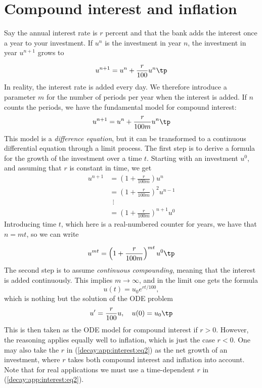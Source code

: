\documentclass[graybox,sectrefs,envcountresetchap,open=right,final]{svmonodo}
\begin{document}
\section{Compound interest and inflation}
\label{decay:app:interest}

Say the annual interest rate is $r$ percent and that the bank
adds the interest once a year to your investment.
If $u^n$ is the investment in year $n$, the investment in year $u^{n+1}$
grows to

\[ u^{n+1} = u^n + \frac{r}{100}u^n
\tp  \]
In reality, the interest rate is added every day. We therefore introduce
a parameter $m$ for the number of periods per year when the interest
is added. If $n$ counts the periods, we have the fundamental model
for compound interest:
\begin{equation}
u^{n+1} = u^n + \frac{r}{100 m}u^n
\tp
\label{decay:app:interest:eq1}
\end{equation}
This model is a \emph{difference equation}, but it can be transformed to a
continuous differential equation through a limit process.
The first step is to derive a formula for the growth of the investment
over a time $t$.
Starting with an investment $u^0$, and assuming that $r$ is constant in time,
we get
\begin{align*}
u^{n+1} &= \left(1 + \frac{r}{100 m}\right)u^{n}\\ 
&= \left(1 + \frac{r}{100 m}\right)^2u^{n-1}\\ 
&\ \ \vdots\\ 
&= \left(1 +\frac{r}{100 m}\right)^{n+1}u^{0}
\end{align*}
Introducing time $t$, which here is a real-numbered counter for years,
we have that $n=mt$, so we can write

\[ u^{mt} = \left(1 + \frac{r}{100 m}\right)^{mt} u^0\tp  \]
The second step is to assume \emph{continuous compounding}, meaning that the
interest is added continuously. This implies $m\rightarrow\infty$, and
in the limit one gets the formula
\begin{equation}
u(t) = u_0e^{rt/100},
\end{equation}
which is nothing but the solution of the ODE problem
\begin{equation}
u^{\prime} = \frac{r}{100}u,\quad u(0)=u_0
\tp
\label{decay:app:interest:eq2}
\end{equation}
This is then taken as the ODE model for compound interest if $r>0$.
However, the reasoning applies equally well to inflation, which is
just the case $r < 0$.
One may also take the $r$ in (\ref{decay:app:interest:eq2})
as the net growth of an investment, where $r$ takes both compound interest
and inflation into account. Note that for real applications we must
use a time-dependent $r$ in (\ref{decay:app:interest:eq2}).
\end{document}
